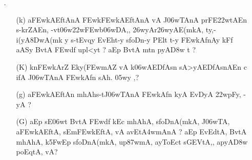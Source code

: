 \def\DevnagVersion{2.15}\documentclass{article}
\begin{document}
\begin{itemize}
\begin{itemize}
          \item[({\dn c})] {\dn s\2foDnPl-y uQAyZAT{\rdt} kA upAyA Bv\306wt, aAEy\?r {\rs ?\re}}
          
          \item[({\dn C})] {\dn s\2-tEv\38DwAEvqy\? y\? EvEvDA, s\2foDnA(mkA, up\387wmA, \3FEwv(y\0\306wt\?{\rs ,\re} t\?qA\2 s\2DAnAy Ek\2Ev D\2 sADnt\306w/\2 Bv\306wt, f\2s\?, {\rs ?\re}}
          
          \item[({\dn j})] {\dn Bv(\3FEwd\?f\? s\2-tmhAEv\38DwAly\? pAWfAlA c s\2foDnAT\0 aE-t ko\35FwEp avkAf, sADnsAmEJ vA {\rs ?\re} yEd vA asO apyA\0\3D8wA -yA kA upAyA tE\392wqy\? Bv\306wt, EnEd\0f\?, {\rs ?\re} }
          
         \end{itemize}


\item[{\dn \dnnum \rn{24}}.] \begin{itemize}
           
          \item[({\dn k})] {\dn a\3FEwkAEftAnA\2 \3FEwk\3FEwkAEftAnA\2 vA J\306wTAnA\2 prFE\322wtAEn s\2-krZAEn{\rs ,\re} -vt\306w\322w\3FEwb\306wDA,{\rs ,\re} \326wyAr\326wyAE(mkA, ty,{\rs -\re}i(yA\38DwA(mk\2 y s\2-tEvqy\? EvEht-y s\2foDn-y PElt t-y \3FEwkAfnAy kFf aASy\2 BvtA\2 \3FEwd\?f\? upl<yt\? {\rs ?\re} aEp BvtA\2 mt\?n pyA\0\3D8w\2 t {\rs ?\re}} 
           
          \item[({\dn K})] {\dn k\?n\3FEwkAr\?Z Eky(\3FEwmAZ\2 vA k\?\306wAEDfAsn\2 sA>yAEDfAsnAEn c ifA\2 J\306wTAnA\2 \3FEwkAfn\? sAh. \305wy\2 \0,{\rs ?\re}} 
          
          \item[({\dn g})] {\dn a\3FEwkAEftAn\2 mhAh\0s\2-tJ\306wTAnA\2 \3FEwkAfn\2 kyA EvDyA\2 \322w\?pFy, -yA {\rs ?\re} }
          
          \item[({\dn G})] {\dn aEp sE\306wt BvtA\2 \3FEwd\?f\? k\?Ec mhAhA\0, s\2foDnA(mkA, J\306wTA, a\3FEwkAEftA, sEm\3FEwkEftA, vA avEt\3A4wmAnA\2 {\rs ?\re} aEp EvEdtA, BvtA\2 mhAhA\0, k\?\35FwEp s\2foDnA(mkA, up\387wmA, ayToEct\2 s\2GEVtA,{\rs ,\re} apyA\0\3D8w\2 poEqtA, vA{\rs ?\re}}
          \end{itemize}


\end{itemize}
\end{document}
